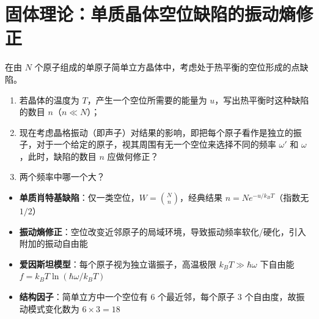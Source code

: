 \section{固体理论：单质晶体空位缺陷的振动熵修正}
\label{sec:vacancy-vibrational-entropy}

\begin{modelbox}[题目：考虑晶格振动影响的空位平衡浓度]
在由 $N$ 个原子组成的单原子简单立方晶体中，考虑处于热平衡的空位形成的点缺陷。
\begin{enumerate}
    \item 若晶体的温度为 $T$，产生一个空位所需要的能量为 $u$，写出热平衡时这种缺陷的数目 $n$（$n\ll N$）；
    \item 现在考虑晶格振动（即声子）对结果的影响，即把每个原子看作是独立的振子，对于一个给定的原子，视其周围有无一个空位来选择不同的频率 $\omega'$ 和 $\omega$，此时，缺陷的数目 $n$ 应做何修正？
    \item 两个频率中哪一个大？
\end{enumerate}
\end{modelbox}

\begin{tipbox}[考点快速分析]
\begin{itemize}
    \item \textbf{单质肖特基缺陷}：仅一类空位，$W=\binom{N}{n}$，经典结果 $n=N e^{-u/k_{\!B}T}$（指数无 $1/2$）
    \item \textbf{振动熵修正}：空位改变近邻原子的局域环境，导致振动频率软化/硬化，引入附加的振动自由能
    \item \textbf{爱因斯坦模型}：每个原子视为独立谐振子，高温极限 $k_{\!B}T\gg\hbar\omega$ 下自由能 $f=k_{\!B}T\ln(\hbar\omega/k_{\!B}T)$
    \item \textbf{结构因子}：简单立方中一个空位有 6 个最近邻，每个原子 3 个自由度，故振动模式变化数为 $6\times 3=18$
\end{itemize}
\end{tipbox}

